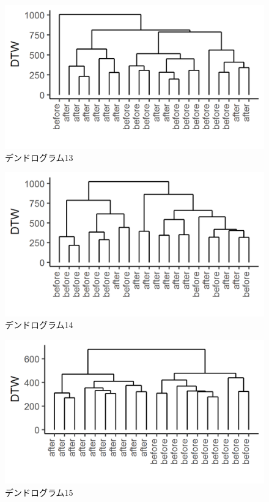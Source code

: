 \documentclass{jarticle}
\begin{document}
\begin{figure}[H]
	\begin{center}
		\includegraphics[width=15cm]{fig/dendro_13.png}
		\caption{デンドログラム13}
		\label{fig:dendro13}
	\end{center}
\end{figure}
\begin{figure}[H]
	\begin{center}
		\includegraphics[width=15cm]{fig/dendro_14.png}
		\caption{デンドログラム14}
		\label{fig:dendro14}
	\end{center}
\end{figure}
\begin{figure}[H]
	\begin{center}
		\includegraphics[width=15cm]{fig/dendro_15.png}
		\caption{デンドログラム15}
		\label{fig:dendro15}

	\end{center}
\end{figure}
\end{document}
